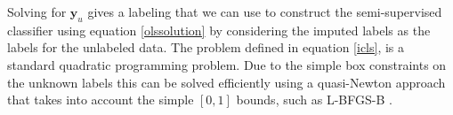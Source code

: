 \documentclass{llncs}
\newcommand{\Nunl}{U}
\newcommand{\Nlab}{L}
\newcommand{\Xe}{\mathbf{X}_e  }
\newcommand{\G}{\left(\Xe^T \Xe \right)^{-1}}
\begin{document}
Solving for $\mathbf{y}_u$ gives a labeling that we can use to construct the semi-supervised classifier using equation \eqref{olssolution} by considering the imputed labels as the labels for the unlabeled data. The problem defined in equation \eqref{icls}, is a standard quadratic programming problem. Due to the simple box constraints on the unknown labels this can be solved efficiently using a quasi-Newton approach that takes into account the simple $[0,1]$ bounds, such as L-BFGS-B \cite{Byrd1995}.
% 
\end{document}
